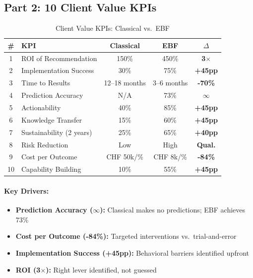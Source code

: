 \subsection{Part 2: 10 Client Value KPIs}

\begin{table}[htbp]
\centering
\caption{Client Value KPIs: Classical vs.\ EBF}
\label{tab:client-kpis}
\renewcommand{\arraystretch}{1.3}
\small
\begin{tabular}{@{}clccc@{}}
\toprule
\textbf{\#} & \textbf{KPI} & \textbf{Classical} & \textbf{EBF} & \textbf{$\Delta$} \\
\midrule
1 & ROI of Recommendation & 150\% & 450\% & \textbf{3$\times$} \\
2 & Implementation Success & 30\% & 75\% & \textbf{+45pp} \\
3 & Time to Results & 12--18 months & 3--6 months & \textbf{-70\%} \\
4 & Prediction Accuracy & N/A & 73\% & \textbf{$\infty$} \\
5 & Actionability & 40\% & 85\% & \textbf{+45pp} \\
6 & Knowledge Transfer & 15\% & 60\% & \textbf{+45pp} \\
7 & Sustainability (2 years) & 25\% & 65\% & \textbf{+40pp} \\
8 & Risk Reduction & Low & High & \textbf{Qual.} \\
9 & Cost per Outcome & CHF 50k/\% & CHF 8k/\% & \textbf{-84\%} \\
10 & Capability Building & 10\% & 55\% & \textbf{+45pp} \\
\bottomrule
\end{tabular}
\end{table}

\paragraph{Key Drivers:}
\begin{itemize}[nosep]
    \item \textbf{Prediction Accuracy ($\infty$):} Classical makes no predictions; EBF achieves 73\%
    \item \textbf{Cost per Outcome (-84\%):} Targeted interventions vs.\ trial-and-error
    \item \textbf{Implementation Success (+45pp):} Behavioral barriers identified upfront
    \item \textbf{ROI (3$\times$):} Right lever identified, not guessed
\end{itemize}

